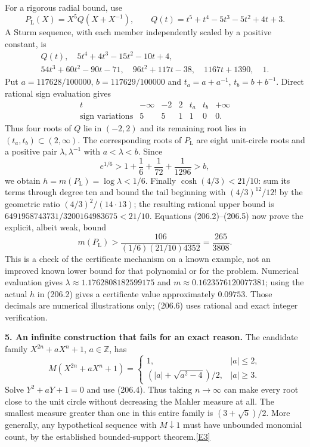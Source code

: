 \documentclass[11pt,a4paper]{article}
\newcommand{\Z}{\mathbb{Z}}
\newcommand{\eref}[2]{\hyperlink{extra:#1:#2}{[E#2]}}
\begin{document}
For a rigorous radial bound, use
\[
 P_\mathrm L(X)=X^5 Q(X+X^{-1}),\qquad
 Q(t)=t^5+t^4-5t^3-5t^2+4t+3.
\]
A Sturm sequence, with each member independently scaled by a positive
constant, is
\[
\begin{gathered}
 Q(t),\quad 5t^4+4t^3-15t^2-10t+4,\\
 54t^3+60t^2-90t-71,\quad96t^2+117t-38,
 \quad1167t+1390,\quad1.
\end{gathered}
\]
Put $a=117628/100000$, $b=117629/100000$ and
$t_a=a+a^{-1}$, $t_b=b+b^{-1}$. Direct rational sign evaluation gives
\[
\begin{array}{c|rrrrrr}
 t&-\infty&-2&2&t_a&t_b&+\infty\\\hline
 \text{sign variations}&5&5&1&1&0&0.
\end{array}
\]
Thus four roots of $Q$ lie in $(-2,2)$ and its remaining root lies in
$(t_a,t_b)\subset(2,\infty)$. The corresponding roots of $P_\mathrm L$
are eight unit-circle roots and a positive pair $\lambda,\lambda^{-1}$
with $a<\lambda<b$. Since
\[
 e^{1/6}>1+\frac16+\frac1{72}+\frac1{1296}>b,
\]
we obtain $h=m(P_\mathrm L)=\log\lambda<1/6$.
Finally $\cosh(4/3)<21/10$: sum its terms through degree ten and bound
the tail beginning with $(4/3)^{12}/12!$ by the geometric ratio
$(4/3)^2/(14\cdot13)$; the resulting rational upper bound is
$6491958743731/3200164983675<21/10$.
Equations (206.2)--(206.5) now prove the explicit, albeit weak, bound
\[
 m(P_\mathrm L)>\frac{106}{(1/6)(21/10)4352}
 =\frac{265}{3808}. \tag{206.6}
\]
This is a check of the certificate mechanism on a known example, not
an improved known lower bound for that polynomial or for the problem.
Numerical evaluation gives $\lambda\approx1.1762808182599175$ and
$m\approx0.1623576120077381$; using the actual $h$ in (206.2) gives a
certificate value approximately $0.09753$. Those decimals are numerical
illustrations only; (206.6) uses rational and exact integer verification.

\textbf{5. An infinite construction that fails for an exact reason.}
The candidate family $X^{2n}+aX^n+1$, $a\in\Z$, has
\[
 M(X^{2n}+aX^n+1)=
 \begin{cases}
 1,&|a|\le2,\\[2pt]
 (|a|+\sqrt{a^2-4})/2,&|a|\ge3.
 \end{cases}
\]
Solve $Y^2+aY+1=0$ and use (206.4). Thus taking $n\to\infty$ can
make every root close to the unit circle without decreasing the Mahler
measure at all. The smallest measure greater than one in this entire
family is $(3+\sqrt5)/2$. More generally, any hypothetical sequence
with $M\downarrow1$ must have unbounded monomial count, by the established
bounded-support theorem.\eref{30003556}{3}
\end{document}
